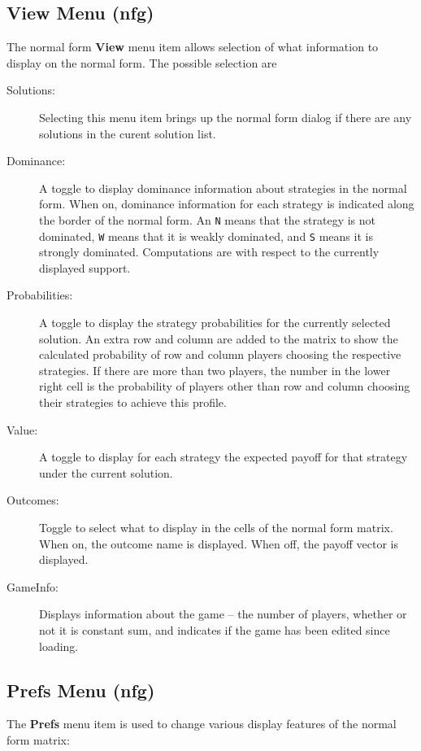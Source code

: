 \documentclass[12pt]{report}
\begin{document}
\subsection{View Menu (nfg)}\label{nfinspectsec}
The normal form {\bf View} menu item allows selection of what
information to display on the normal form.  The possible selection are 

\begin{description}
\item[Solutions:]  Selecting this menu item brings up the normal form 
 dialog if
there are any solutions in the curent solution list.
\item[Dominance:]  A toggle to display dominance information about
strategies in the normal form. When on, dominance information for each
strategy is indicated along the border of the normal form.  An {\tt N} 
means that the strategy is not dominated, {\tt W} means that it is
weakly dominated, and {\tt S} means it is strongly
dominated.  Computations are with respect to the currently displayed
support.
\item[Probabilities:]  A toggle to display the strategy probabilities
for the currently selected solution.  An extra row and column are
added to the matrix to show the calculated probability of row and
column players choosing the respective strategies.  If there are more
than two players, the number in the lower right cell is the
probability of players other than row and column choosing their
strategies to achieve this profile.
\item[Value:]  A toggle to display for each strategy the expected 
payoff for that strategy under the current solution.  
\item[Outcomes:] Toggle to select what to display in the cells of the normal form matrix.  When on, the outcome name is displayed.  When off, the payoff vector is displayed.  
\item[GameInfo:] Displays information about the game -- the number
of players, whether or not it is constant sum, and indicates if the
game has been edited since loading.
\end{description}

\subsection{Prefs Menu (nfg)}
The {\bf Prefs} menu item is used to change various display features
of the normal form matrix:  
\end{document}
